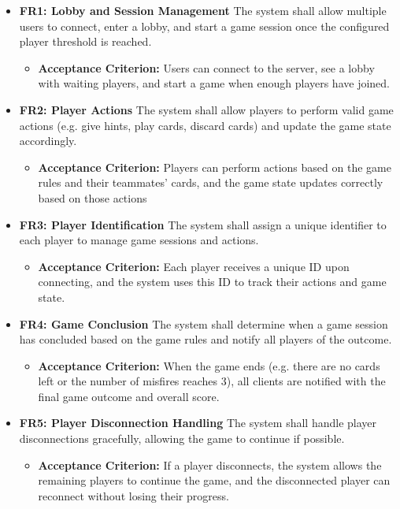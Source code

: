 \documentclass{scrartcl}
\begin{document}
\begin{itemize}
  \item \textbf{FR1: Lobby and Session Management} \newline
  The system shall allow multiple users to connect, enter a lobby, and start a game session once the configured player threshold is reached.
  \begin{itemize}
    \item \textbf{Acceptance Criterion:} Users can connect to the server, see a lobby with waiting players, and start a game when enough players have joined.
  \end{itemize}

  \item \textbf{FR2: Player Actions} \newline
  The system shall allow players to perform valid game actions (e.g. give hints, play cards, discard cards) and update the game state accordingly.
  \begin{itemize}
    \item \textbf{Acceptance Criterion:} Players can perform actions based on the game rules and their teammates' cards, and the game state updates correctly based on those actions
  \end{itemize}

  \item \textbf{FR3: Player Identification} \newline
  The system shall assign a unique identifier to each player to manage game sessions and actions.
  \begin{itemize}
    \item \textbf{Acceptance Criterion:} Each player receives a unique ID upon connecting, and the system uses this ID to track their actions and game state.
  \end{itemize}

  \item \textbf{FR4: Game Conclusion} \newline
  The system shall determine when a game session has concluded based on the game rules and notify all players of the outcome.
  \begin{itemize}
    \item \textbf{Acceptance Criterion:} When the game ends (e.g. there are no cards left or the number of misfires reaches 3), all clients are notified with the final game outcome and overall score.    
  \end{itemize}

  \item \textbf{FR5: Player Disconnection Handling} \newline
  The system shall handle player disconnections gracefully, allowing the game to continue if possible.
  \begin{itemize}
    \item \textbf{Acceptance Criterion:} If a player disconnects, the system allows the remaining players to continue the game, and the disconnected player can reconnect without losing their progress.
  \end{itemize}


\end{itemize}
\end{document}
